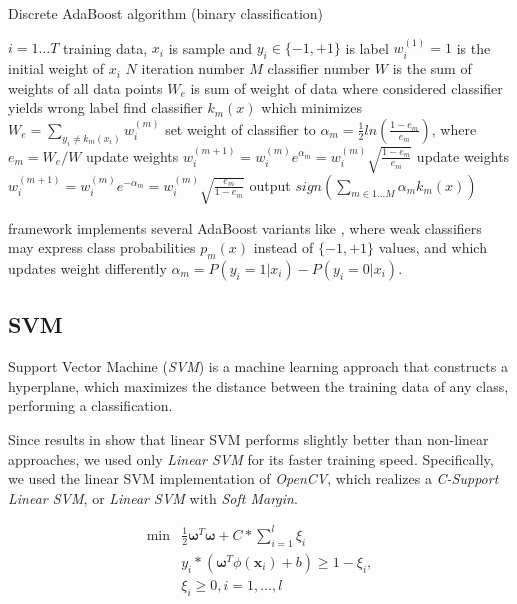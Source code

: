 \begin{algorithm}
\caption{Discrete AdaBoost algorithm (binary classification)}
\label{alg:adaboost}
\begin{algorithmic}
\STATE $i=1 \ldots T$ training data, $x_i$ is sample and $y_i \in \{-1,+1\}$ is label
\STATE $w_{i}^{(1)}=1$ is the initial weight of $x_i$
\STATE $N$ iteration number
\STATE $M$ classifier number
\STATE $W$ is the sum of weights of all data points
\STATE $W_e$ is sum of weight of data where considered classifier yields wrong label
		\STATE find classifier $k_{m}(x)$ which minimizes $W_e=\sum_{y_i \neq k_m(x_i)}{w_{i}^{(m)}}$
		\STATE set weight of classifier to $\alpha_{m}=\frac{1}{2}ln(\frac{1-e_m}{e_m}) $, where $e_m=W_e/W$
	 		\STATE update weights $w_{i}^{(m+1)}=w_{i}^{(m)}e^{\alpha_m}=w_{i}^{(m)}\sqrt{\frac{1-e_m}{e_m}}$
		\ELSE
			\STATE update weights $w_{i}^{(m+1)}=w_{i}^{(m)}e^{-\alpha_m}=w_{i}^{(m)}\sqrt{\frac{e_m}{1-e_m}}$
 		\ENDIF
\STATE output $sign( \sum_{m \in 1 \ldots M}{ \alpha_m k_m (x)} )$
\ENDFOR
\end{algorithmic}
\end{algorithm}

 framework implements several AdaBoost variants like , where weak classifiers may express class probabilities $p_m(x)$ instead of $\{-1,+1\}$ values, and  which updates weight differently $\alpha_{m}=P(y_i=1|x_i)-P(y_i=0|x_i)$.


\subsection{SVM}
Support Vector Machine (\emph{SVM}) is a machine learning approach that
 constructs a hyperplane, which maximizes the distance between the training
 data of any class, performing a classification.

 Since results in \cite{Littlewort04dynamicsof} show that linear SVM performs
 slightly better than non-linear approaches, we used only \emph{Linear SVM} for
 its faster training speed. Specifically, we used the linear SVM implementation
 of \emph{OpenCV}, which realizes a \emph{C-Support Linear SVM}, or \emph{Linear SVM} with \emph{Soft Margin}.

 \begin{align}
   \min & \frac{1}{2} \boldsymbol{\omega}^T \boldsymbol{\omega} + C*\sum_{i=1}^l \xi_i\\
   & y_i * (\boldsymbol{\omega}^T \phi(\textbf{x}_i) + b) \geq 1 - \xi_i,\\
   & \xi_i \geq 0, i = 1, \dots, l
   \label{mt:lin_svm}
 \end{align}

